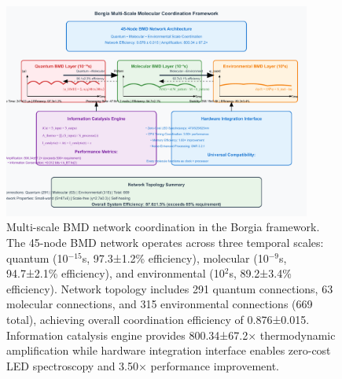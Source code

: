 % 
%
\begin{figure}[H]
    \centering
    \includegraphics[width=0.9\textwidth]{images/multidomain-molecular-coordination.pdf}
    \caption{Multi-scale BMD network coordination in the Borgia framework. The 45-node BMD network operates across three temporal scales: quantum (10$^{-15}$s, 97.3±1.2\% efficiency), molecular (10$^{-9}$s, 94.7±2.1\% efficiency), and environmental (10$^{2}$s, 89.2±3.4\% efficiency). Network topology includes 291 quantum connections, 63 molecular connections, and 315 environmental connections (669 total), achieving overall coordination efficiency of 0.876±0.015. Information catalysis engine provides 800.34±67.2× thermodynamic amplification while hardware integration interface enables zero-cost LED spectroscopy and 3.50× performance improvement.}
    \label{fig:multiscale_framework}
    \end{figure}
